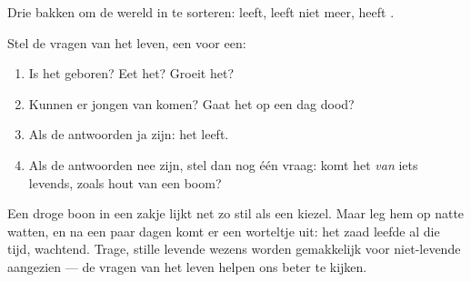 \begin{omfigure}

{\small Drie bakken om de wereld in te sorteren: leeft, leeft niet
meer, heeft .}
\end{omfigure}

\begin{method}\label{met:g1:living-or-not:decide}
Stel de vragen van het leven, een voor een:
\begin{enumerate}
  \item Is het geboren? Eet het? Groeit het?
  \item Kunnen er jongen van komen? Gaat het op een dag dood?
  \item Als de antwoorden ja zijn: het leeft.
  \item Als de antwoorden nee zijn, stel dan nog één vraag: komt het
        \emph{van} iets levends, zoals hout van een boom?
\end{enumerate}
\end{method}

\begin{remark}\label{rem:g1:living-or-not:seed}
Een droge boon in een zakje lijkt net zo stil als een kiezel. Maar leg
hem op natte watten, en na een paar dagen komt er een worteltje uit:
het zaad leefde al die tijd, wachtend. Trage, stille levende wezens
worden gemakkelijk voor niet-levende aangezien --- de vragen van het
leven helpen ons beter te kijken.
\end{remark}

